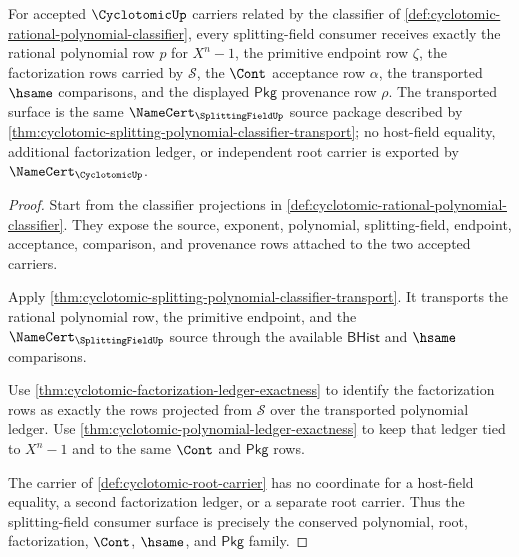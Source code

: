 \begin{theorem}
\label{thm:cyclotomic-splittingfield-provenance-conservation}
For accepted $\CyclotomicUp$ carriers related by the classifier of \autoref{def:cyclotomic-rational-polynomial-classifier}, every splitting-field consumer receives exactly the rational polynomial row $p$ for $X^n-1$, the primitive endpoint row $\zeta$, the factorization rows carried by $\mathcal{S}$, the $\Cont$ acceptance row $\alpha$, the transported $\hsame$ comparisons, and the displayed $\mathsf{Pkg}$ provenance row $\rho$. The transported surface is the same $\NameCert_{\SplittingFieldUp}$ source package described by \autoref{thm:cyclotomic-splitting-polynomial-classifier-transport}; no host-field equality, additional factorization ledger, or independent root carrier is exported by $\NameCert_{\CyclotomicUp}$.
\end{theorem}
\begin{proof}
Start from the classifier projections in \autoref{def:cyclotomic-rational-polynomial-classifier}. They expose the source, exponent, polynomial, splitting-field, endpoint, acceptance, comparison, and provenance rows attached to the two accepted carriers.

Apply \autoref{thm:cyclotomic-splitting-polynomial-classifier-transport}. It transports the rational polynomial row, the primitive endpoint, and the $\NameCert_{\SplittingFieldUp}$ source through the available $\mathsf{BHist}$ and $\hsame$ comparisons.

Use \autoref{thm:cyclotomic-factorization-ledger-exactness} to identify the factorization rows as exactly the rows projected from $\mathcal{S}$ over the transported polynomial ledger. Use \autoref{thm:cyclotomic-polynomial-ledger-exactness} to keep that ledger tied to $X^n-1$ and to the same $\Cont$ and $\mathsf{Pkg}$ rows.

The carrier of \autoref{def:cyclotomic-root-carrier} has no coordinate for a host-field equality, a second factorization ledger, or a separate root carrier. Thus the splitting-field consumer surface is precisely the conserved polynomial, root, factorization, $\Cont$, $\hsame$, and $\mathsf{Pkg}$ family.
\end{proof}

